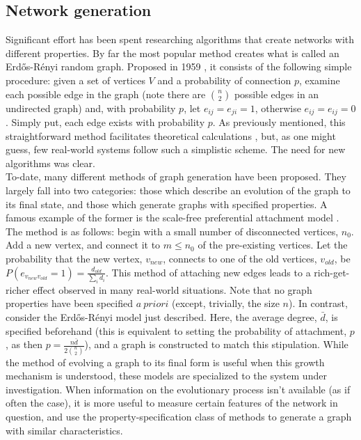 \documentclass[11pt]{article}
\begin{document}
\subsection{Network generation}
Significant effort has been spent researching algorithms that create networks with different properties. By far the most popular method creates what is called an Erd\H{o}s-R\'{e}nyi random graph. Proposed in 1959 \cite{originalERpaper}, it consists of the following simple procedure: given a set of vertices $V$ and a probability of connection $p$, examine each possible edge in the graph (note there are ${n \choose 2}$ possible edges in an undirected graph) and, with probability $p$, let $e_{ij}=e_{ji}=1$, otherwise $e_{ij}=e_{ij}=0$. Simply put, each edge exists with probability $p$. As previously mentioned, this straightforward method facilitates theoretical calculations \cite{a couple math papers}, but, as one might guess, few real-world systems follow such a simplistic scheme. The need for new algorithms was clear. \vspace{1mm}\\
To-date, many different methods of graph generation have been proposed. They largely fall into two categories: those which describe an evolution of the graph to its final state, and those which generate graphs with specified properties. A famous example of the former is the scale-free preferential attachment model \cite{emergenceOfScalingInRandNet}. The method is as follows: begin with a small number of disconnected vertices, $n_{0}$. Add a new vertex, and connect it to $m\le n_{0}$ of the pre-existing vertices. Let the probability that the new vertex, $v_{new}$, connects to one of the old vertices, $v_{old}$, be $P(e_{v_{new}v_{old}}=1)=\frac{d_{old}}{\sum\limits_{i} d_{i}}$. This method of attaching new edges leads to a rich-get-richer effect observed in many real-world situations. Note that no graph properties have been specified $a\ priori$ (except, trivially, the size $n$). In contrast, consider the Erd\H{o}s-R\'{e}nyi model just described. Here, the average degree, $\bar{d}$, is specified beforehand (this is equivalent to setting the probability of attachment, $p$, as then $p=\frac{n\bar{d}}{2 {n \choose 2}}$), and a graph is constructed to match this stipulation. While the method of evolving a graph to its final form is useful when this growth mechanism is understood, these models are specialized to the system under investigation. When information on the evolutionary process isn't available (as if often the case), it is more useful to measure certain features of the network in question, and use the property-specification class of methods to generate a graph with similar characteristics.\vspace{1mm}\\
\end{document}
